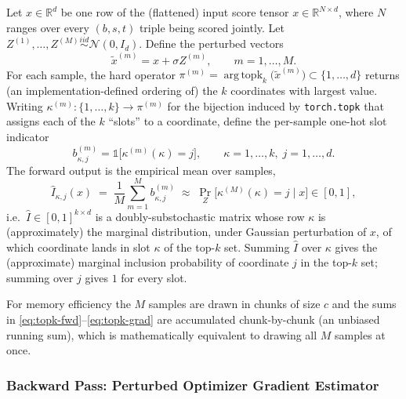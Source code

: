 \documentclass[stu,floatsintext]{apa7}
\newcommand{\R}{\mathbb{R}}
\DeclareMathOperator*{\argtopk}{arg\,topk}
\begin{document}
Let $x\in\R^{d}$ be one row of the (flattened) input score tensor $x\in\R^{N\times d}$, where
$N$ ranges over every $(b,s,t)$ triple being scored jointly. Let $Z^{(1)},\dots,Z^{(M)}
\overset{iid}{\sim}\mathcal N(0,I_d)$. Define the perturbed vectors
\begin{equation}
  \tilde x^{(m)} = x + \sigma Z^{(m)}, \qquad m=1,\dots,M .
\end{equation}
For each sample, the hard operator $\pi^{(m)} = \argtopk_k\bigl(\tilde x^{(m)}\bigr)\subset\{1,\dots,d\}$
returns (an implementation-defined ordering of) the $k$ coordinates with largest value. Writing
$\kappa^{(m)}:\{1,\dots,k\}\to\pi^{(m)}$ for the bijection induced by \texttt{torch.topk} that assigns
each of the $k$ ``slots'' to a coordinate, define the per-sample one-hot slot indicator
\begin{equation}
  b^{(m)}_{\kappa,j} = \mathbb 1\bigl[\kappa^{(m)}(\kappa)=j\bigr], \qquad \kappa=1,\dots,k,\; j=1,\dots,d .
\end{equation}
The forward output is the empirical mean over samples,
\begin{equation}
  \label{eq:topk-fwd}
  \hat I_{\kappa,j}(x) \;=\; \frac{1}{M}\sum_{m=1}^{M} b^{(m)}_{\kappa,j}
  \;\approx\; \Pr_{Z}\bigl[\kappa^{(M)}(\kappa) = j \mid x\bigr] \in[0,1],
\end{equation}
i.e.\ $\hat I\in[0,1]^{k\times d}$ is a doubly-substochastic matrix whose row $\kappa$ is (approximately)
the marginal distribution, under Gaussian perturbation of $x$, of which coordinate lands in slot $\kappa$
of the top-$k$ set. Summing $\hat I$ over $\kappa$ gives the (approximate) marginal inclusion
probability of coordinate $j$ in the top-$k$ set; summing over $j$ gives $1$ for every slot.

For memory efficiency the $M$ samples are drawn in chunks of size $c$ and the sums in
\eqref{eq:topk-fwd}--\eqref{eq:topk-grad} are accumulated chunk-by-chunk (an unbiased running sum), which
is mathematically equivalent to drawing all $M$ samples at once.

\subsubsection{Backward Pass: Perturbed Optimizer Gradient Estimator}
\end{document}
